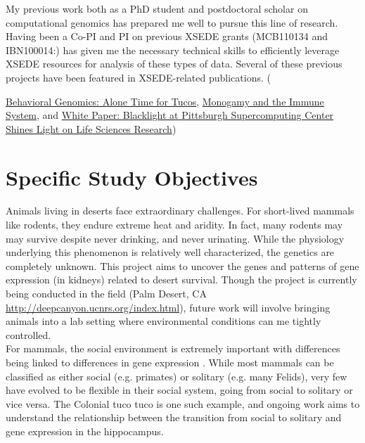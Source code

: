 \documentclass[10.5pt]{article}
\begin{document}
\noindent
My previous work both as a PhD student and postdoctoral scholar on computational genomics has prepared me well to pursue this line of research. Having been a Co-PI and PI on previous XSEDE grants (MCB110134 and IBN100014:) has given me the necessary technical skills to efficiently leverage XSEDE resources for analysis of these types of data. Several of these previous projects have been featured in XSEDE-related publications. ({\href{http://goo.gl/3lXKf}{Behavioral Genomics: Alone Time for Tucos}, \href{http://goo.gl/fasl6}{Monogamy and the Immune System}, and \href{http://goo.gl/iGKSN}{White Paper: Blacklight at Pittsburgh Supercomputing Center Shines Light on Life Sciences Research})

\section*{Specific Study Objectives}

Animals living in deserts face extraordinary challenges. For short-lived mammals like rodents, they endure extreme heat and aridity. In fact, many rodents may may survive despite never drinking, and never urinating. While the physiology underlying this phenomenon is relatively well characterized, the genetics are completely unknown. This project aims to uncover the genes and patterns of gene expression (in kidneys) related to desert survival. Though the project is currently being conducted in the field (Palm Desert, CA \url{http://deepcanyon.ucnrs.org/index.html}), future work will involve bringing animals into a lab setting where environmental conditions can me tightly controlled. \\

\noindent
For mammals, the social environment is extremely important with differences being linked to differences in gene expression \citep{WINSLOW:1993vr}. While most mammals can be classified as either social (e.g. primates) or solitary (e.g. many Felids), very few have evolved to be flexible in their social system, going from social to solitary or vice versa. The Colonial tuco tuco is one such example, and ongoing work aims to understand the relationship between the transition from social to solitary and gene expression in the hippocampus. \\

}
\end{document}
